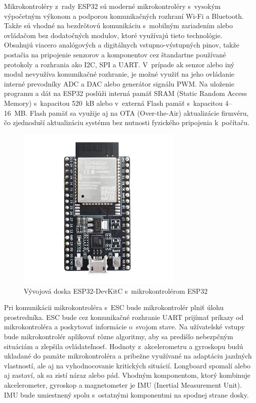 Mikrokontroléry z~rady ESP32 sú moderné mikrokontroléry s~vysokým výpočetným výkonom a podporou komunikačných rozhraní Wi-Fi a Bluetooth.
Takže sú vhodné na bezdrôtovú komunikáciu s~mobilným zariadením alebo ovládačom bez dodatočných modulov, ktoré využívajú tieto technológie.
Obsahujú viacero analógových a digitálnych vstupno-výstupných pinov, takže postačia na pripojenie senzorov a komponentov cez štandartne používané protokoly a rozhrania ako I2C, SPI a UART\@.
V~prípade ak senzor alebo iný modul nevyužíva komunikačné rozhranie, je možné využiť na jeho ovládanie interné prevodníky ADC a DAC alebo generátor signálu PWM\@.
Na uloženie programu a dát na ESP32 poslúži interná pamäť SRAM (Static Random Access Memory) s~kapacitou 520~kB alebo v~externá Flash pamäť s~kapacitou 4--16~MB\@.
Flash pamäť sa využije aj na OTA (Over-the-Air) aktualizácie firmvéru, čo zjednoduší aktualizáciu systému bez nutnosti fyzického pripojenia k~počítaču.\cite{Espressif}

\begin{figure}
    \centering
    \includegraphics[height=8cm]{obrazky-figures/esp32-devkit.png}
    \caption{Vývojová doska ESP32-DevKitC s~mikrokontrolérom ESP32\cite{Espressif}}
\end{figure}

Pri komunikácii mikrokontroléra s~ESC bude mikrokontrolér plniť úlohu prostredníka.
ESC bude cez komunikačné rozhranie UART prijímať príkazy od mikrokontroléra a poskytovať informácie o~svojom stave.
Na užívatelské vstupy bude mikrokontrolér aplikovať rôzne algoritmy, aby sa predišlo nebezpčným situáciám a zlepšila ovládateľnosť.
Hodnoty z~akcelerometru a gyroskopu budú ukladané do pamäte mikrokontroléra a pribežne využívané na adaptáciu jazdných vlastností, ale aj na vyhodnocovanie kritických situácií.
Longboard spomalí alebo aj zastaví, ak sa zistí náraz alebo pád.
Vhodným komponentom, ktorý kombinuje akcelerometer, gyroskop a magnetometer je IMU (Inertial Measurement Unit).
IMU bude umiestnený spolu s~ostatnými komponentmi na spodnej strane dosky.

